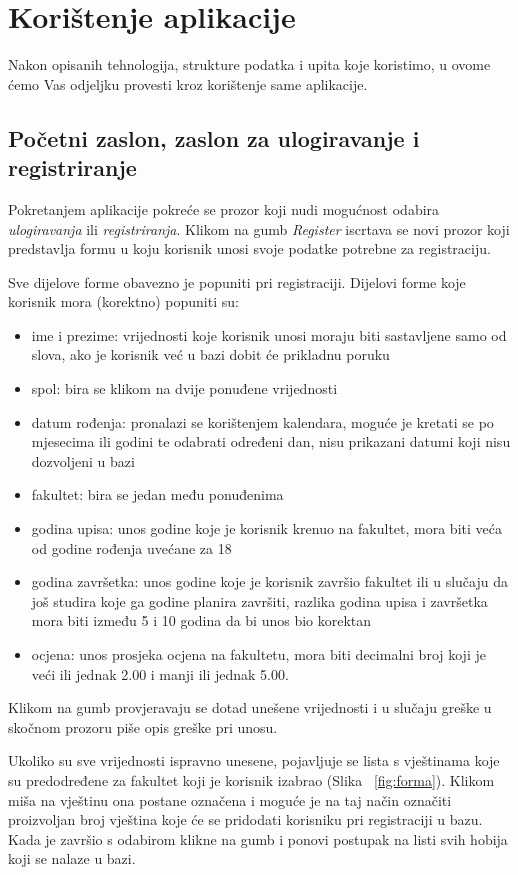 \documentclass[titlepage, 12pt]{scrartcl}
\begin{document}
	\newpage
	\section{Korištenje aplikacije}
	Nakon opisanih tehnologija, strukture podatka i upita koje koristimo, u ovome ćemo Vas odjeljku provesti kroz korištenje same aplikacije. 
	
	\subsection{Početni zaslon, zaslon za ulogiravanje i registriranje}
	Pokretanjem aplikacije pokreće se prozor koji nudi mogućnost odabira \emph{ulogiravanja} ili \emph{registriranja}. Klikom na gumb \emph{Register} iscrtava se novi prozor koji predstavlja formu u koju korisnik unosi svoje podatke potrebne za registraciju. 
	
	Sve dijelove forme obavezno je popuniti pri registraciji. Dijelovi forme koje korisnik mora (korektno) popuniti su:
	\begin{itemize}
		\item ime i prezime: vrijednosti koje korisnik unosi moraju biti sastavljene samo od slova, ako je korisnik već u bazi dobit će prikladnu poruku
		\item spol: bira se klikom na dvije ponuđene vrijednosti
		\item datum rođenja: pronalazi se korištenjem kalendara, moguće je kretati se po mjesecima ili godini te odabrati određeni dan, nisu prikazani datumi koji nisu dozvoljeni u bazi
		\item fakultet: bira se jedan među ponuđenima
		\item godina upisa: unos godine koje je korisnik krenuo na fakultet, mora biti veća od godine rođenja uvećane za 18
		\item godina završetka: unos godine koje je korisnik završio fakultet ili u slučaju da još studira koje ga godine planira završiti, razlika godina upisa i završetka mora biti između 5 i 10 godina da bi unos bio korektan
		\item ocjena: unos prosjeka ocjena na fakultetu, mora biti decimalni broj koji je veći ili jednak 2.00 i manji ili jednak 5.00.
	\end{itemize}
	
	Klikom na gumb provjeravaju se dotad unešene vrijednosti i u slučaju greške u skočnom prozoru piše opis greške pri unosu. 
	
	Ukoliko su sve vrijednosti ispravno unesene, pojavljuje se lista s vještinama koje su predodređene za fakultet koji je korisnik izabrao (Slika ~\ref{fig:forma}). Klikom miša na vještinu ona postane označena i moguće je na taj način označiti proizvoljan broj vještina koje će se pridodati korisniku pri registraciji u bazu. Kada je završio s odabirom klikne na gumb i ponovi postupak na listi svih hobija koji se nalaze u bazi. 
	
\end{document}
